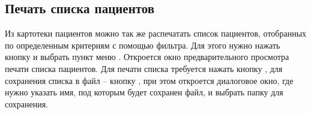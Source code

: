 \subsection{Печать списка пациентов}

Из картотеки пациентов можно так же распечатать список пациентов, отобранных по определенным критериям с помощью фильтра. Для этого нужно нажать кнопку   и выбрать пункт меню . Откроется окно предварительного просмотра печати списка пациентов. Для печати списка требуется нажать кнопку , для сохранения списка в файл – кнопку  , при этом откроется диалоговое окно, где нужно указать имя, под которым будет сохранен файл, и выбрать папку для сохранения.

